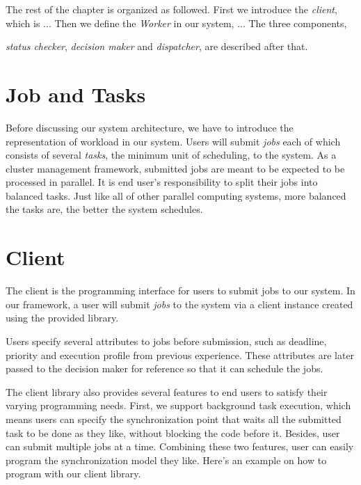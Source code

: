 The rest of the chapter is organized as followed.  
First we introduce the \emph{client}, which is ...
Then we define the \emph{Worker} in our system, ...
The three components, { \emph{status checker}, \emph{decision maker} and
\emph{dispatcher}, are described after that.

\section{Job and Tasks}

Before discussing our system architecture, we have to introduce the
representation of workload in our system.
Users will submit \emph{jobs} each of which consists of several
\emph{tasks}, the minimum unit of scheduling, to the system.
As a cluster management framework, submitted jobs are meant to be
expected to be processed in parallel.
It is end user's responsibility to split their jobs into balanced tasks.
Just like all of other parallel computing systems, more balanced the
tasks are, the better the system schedules.

\section{Client}

The client is the programming interface for users to submit jobs to our
system.
In our framework, a user will submit \emph{jobs} to the system via a
client instance created using the provided library.

Users specify several attributes to jobs before submission, such as
deadline, priority and execution profile from previous experience.
These attributes are later passed to the decision maker for reference so
that it can schedule the jobs.

The client library also provides several features to end users to
satisfy their varying programming needs.
First, we support background task execution, which means users can
specify the synchronization point that waits all the submitted task to
be done as they like, without blocking the code before it.
Besides, user can submit multiple jobs at a time.
Combining these two features, user can easily program the
synchronization model they like.
Here's an example on how to program with our client library.

\begin{Example Code}


\end{Example Code}}
